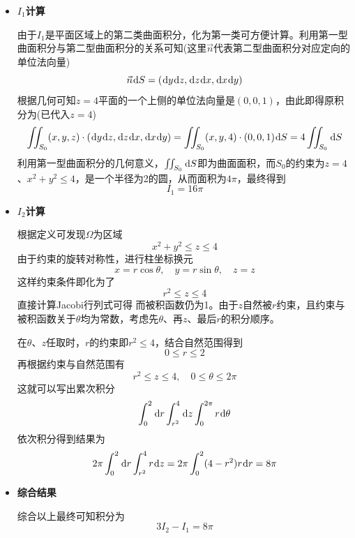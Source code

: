 \documentclass[a4paper,UTF8,fontset=windows,AutoFakeBold]{ctexart}
\newcommand*{\dr}{\hspace{0.07em}\mathrm{d}}
\newcommand*{\nv}{\vec{n}}
\newcommand*{\rb}{\mathbb{R}}
\theoremstyle{ex}
\begin{document}
\begin{framed}
{\begin{itemize}
        将被积函数看作$P\dr y\dr z+Q\dr z\dr x+R\dr x\dr y$，由初等函数知$P$、$Q$、$R$在$\rb^3$上可导且导函数连续，直接计算得
        $$P_x+Q_y+R_z=3$$
        由于积分区域并非封闭曲面，我们补上顶部的
        $$S_0:\quad z=4,\quad x^2+y^2\le z$$
        并取上侧为正向。

        根据定义$S_0$在$S$的上方，因此$S_0$的上侧、$S$的下侧构成两者围成的封闭曲面的外侧。设围成的区域为$\Omega$，由高斯公式可知
        $$\iint_S(x\dr y\dr z+y\dr z\dr x+z\dr x\dr y)+\iint_{S_0}(x\dr y\dr z+y\dr z\dr x+z\dr x\dr y)=3\iiint_\Omega\dr V$$
        由此设
        $$I_1=\iint_{S_0}(x\dr y\dr z+y\dr z\dr x+z\dr x\dr y),\quad I_2=\iiint_\Omega\dr V$$
        结果即为$3I_2-I_1$。

        \item \textbf{$I_1$计算}
        
        由于$I_1$是平面区域上的第二类曲面积分，化为第一类可方便计算。利用第一型曲面积分与第二型曲面积分的关系可知(这里$\nv$代表第二型曲面积分对应定向的单位法向量)
        $$\nv\dr S=(\dr y\dr z,\dr z\dr x,\dr x\dr y)$$   
        根据几何可知$z=4$平面的一个上侧的单位法向量是$(0,0,1)$，由此即得原积分为(已代入$z=4$)
        $$\iint_{S_0}(x,y,z)\cdot(\dr y\dr z,\dr z\dr x,\dr x\dr y)=\iint_{S_0}(x,y,4)\cdot(0,0,1)\dr S=4\iint_{S_0}\dr S$$
        利用第一型曲面积分的几何意义，$\iint_{S_0}\dr S$即为曲面面积，而$S_0$的约束为$z=4$、$x^2+y^2\le4$，是一个半径为2的圆，从而面积为$4\pi$，最终得到
        $$I_1=16\pi$$
        
        \item \textbf{$I_2$计算}
        
        根据定义可发现$\Omega$为区域
        $$x^2+y^2\le z\le 4$$
        由于约束的旋转对称性，进行柱坐标换元
        $$x=r\cos\theta,\quad y=r\sin\theta,\quad z=z$$
        这样约束条件即化为了
        $$r^2\le z\le4$$
        直接计算Jacobi行列式可得
        而被积函数仍为1。由于$z$自然被$r$约束，且约束与被积函数关于$\theta$均为常数，考虑先$\theta$、再$z$、最后$r$的积分顺序。
        
        在$\theta$、$z$任取时，$r$的约束即$r^2\le4$，结合自然范围得到
        $$0\le r\le2$$
        再根据约束与自然范围有
        $$r^2\le z\le4,\quad0\le\theta\le2\pi$$
        这就可以写出累次积分
        $$\int_0^2\dr r\int_{r^2}^4\dr z\int_0^{2\pi}r\dr\theta$$
        依次积分得到结果为
        $$2\pi\int_0^2\dr r\int_{r^2}^4r\dr z=2\pi\int_0^2(4-r^2)r\dr r=8\pi$$

        \item \textbf{综合结果}

        综合以上最终可知积分为
        $$3I_2-I_1=8\pi$$
    \end{itemize}
}
\end{framed}
\end{document}
